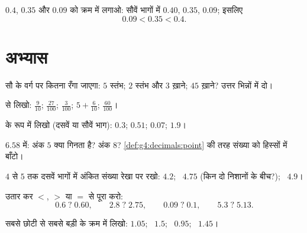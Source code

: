 \begin{example}\label{ex:g4:decimals:compare}
$0.4$, $0.35$ और $0.09$ को क्रम में लगाओ: सौवें भागों में
$0.40$, $0.35$, $0.09$; इसलिए
\[
0.09 < 0.35 < 0.4 .
\]
\end{example}

\section{अभ्यास}

\begin{exercise}[$\star$]\label{exo:g4:decimals:1}
सौ के वर्ग पर कितना रँगा जाएगा: $5$ स्तंभ; $2$ स्तंभ और $3$
ख़ाने; $45$ ख़ाने? उत्तर भिन्नों में दो।
\end{exercise}

\begin{exercise}[$\star$]\label{exo:g4:decimals:2}
 से लिखो:
$\frac{9}{10}$; \quad $\frac{27}{100}$; \quad $\frac{3}{100}$; \quad
$5 + \frac{6}{10}$; \quad $\frac{60}{100}$।
\end{exercise}

\begin{exercise}[$\star$]\label{exo:g4:decimals:3}
 के रूप में लिखो (दसवें या सौवें भाग):
$0.3$; \quad $0.51$; \quad $0.07$; \quad $1.9$।
\end{exercise}

\begin{exercise}[$\star$]\label{exo:g4:decimals:4}
$6.58$ में: अंक $5$ क्या गिनता है? अंक $8$?
\cref{def:g4:decimals:point} की तरह संख्या को हिस्सों में बाँटो।
\end{exercise}

\begin{exercise}[$\star$]\label{exo:g4:decimals:5}
$4$ से $5$ तक दसवें भागों में अंकित संख्या रेखा पर रखो:
$4.2$; \ $4.75$ (किन दो निशानों के बीच?); \ $4.9$।
\end{exercise}

\begin{exercise}[$\star$]\label{exo:g4:decimals:6}
उतार कर $<$, $>$ या $=$ से पूरा करो:
\[
0.6 \;?\; 0.60, \qquad
2.8 \;?\; 2.75, \qquad
0.09 \;?\; 0.1, \qquad
5.3 \;?\; 5.13 .
\]
\end{exercise}

\begin{exercise}[$\star$]\label{exo:g4:decimals:7}
सबसे छोटी से सबसे बड़ी के क्रम में लिखो: $1.05$; \ $1.5$; \ $0.95$; \ $1.45$।
\end{exercise}

